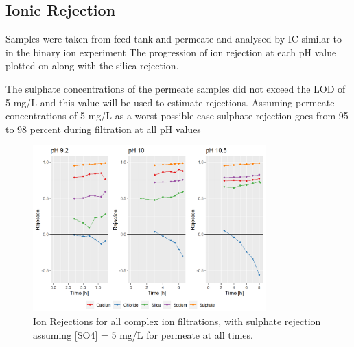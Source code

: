 



\subsection{Ionic Rejection}
Samples were taken from feed tank and permeate and analysed by IC similar to in the binary ion experiment 
The progression of ion rejection at each pH value plotted on  along with the silica rejection.

The sulphate concentrations of the permeate samples did not exceed the LOD of 5 mg/L and this value will be used to estimate rejections.
Assuming permeate concentrations of 5 mg/L as a worst possible case sulphate rejection goes from 95 to 98 percent during filtration at all pH values


\begin{figure}[H]
    \centering
    \includegraphics[width=0.8\textwidth]{Billeder/data/multi_salt/multisalt_ion_rejections_with_sulphate_and_silica.png}
    \caption{Ion Rejections for all complex ion filtrations, with sulphate rejection assuming [SO4] = 5 mg/L for permeate at all times.}
    \label{fig:multi_salt_pH_ion_rejections_samlet_med_sulfat_og_silica}
\end{figure}


